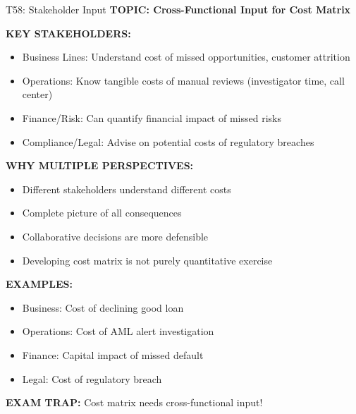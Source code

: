 \documentclass[8pt]{beamer}
\begin{document}
	\begin{frame}{T58: Stakeholder Input}
		\fontsize{6.5}{7.5}\selectfont
		\textbf{TOPIC: Cross-Functional Input for Cost Matrix}
		
		\vspace{0.1cm}
		\textbf{KEY STAKEHOLDERS:}
		\begin{itemize}
			\item \textcolor{myblue}{Business Lines:} Understand cost of missed opportunities, customer attrition
			\item \textcolor{myblue}{Operations:} Know tangible costs of manual reviews (investigator time, call center)
			\item \textcolor{myblue}{Finance/Risk:} Can quantify financial impact of missed risks
			\item \textcolor{myblue}{Compliance/Legal:} Advise on potential costs of regulatory breaches
		\end{itemize}
		
		\vspace{0.1cm}
		\textbf{WHY MULTIPLE PERSPECTIVES:}
		\begin{itemize}
			\item Different stakeholders understand different costs
			\item Complete picture of all consequences
			\item Collaborative decisions are more defensible
			\item Developing cost matrix is not purely quantitative exercise
		\end{itemize}
		
		\vspace{0.1cm}
		\textbf{EXAMPLES:}
		\begin{itemize}
			\item Business: Cost of declining good loan
			\item Operations: Cost of AML alert investigation
			\item Finance: Capital impact of missed default
			\item Legal: Cost of regulatory breach
		\end{itemize}
		
		\textcolor{myred}{\textbf{EXAM TRAP:}} Cost matrix needs \textcolor{myblue}{cross-functional input}!
	\end{frame}
	
\end{document}
